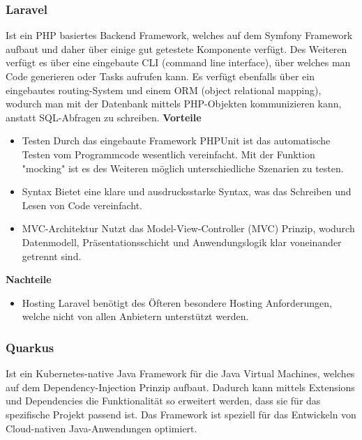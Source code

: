 \subsubsection{Laravel}
Ist ein PHP basiertes Backend Framework, welches auf dem Symfony Framework aufbaut und daher über einige gut getestete Komponente verfügt. Des Weiteren verfügt es über eine eingebaute CLI (command line interface), über welches man Code generieren oder Tasks aufrufen kann. Es verfügt ebenfalls über ein eingebautes routing-System und einem ORM (object relational mapping), wodurch man mit der Datenbank mittels PHP-Objekten kommunizieren kann, anstatt SQL-Abfragen zu schreiben.
\newline
\textbf{Vorteile}
\begin{itemize}
    \item Testen
        \newline
        Durch das eingebaute Framework PHPUnit ist das automatische Testen vom Programmcode wesentlich vereinfacht. Mit der Funktion "mocking" ist es des Weiteren möglich unterschiedliche Szenarien zu testen.
    \item Syntax
        \newline
        Bietet eine klare und ausdrucksstarke Syntax, was das Schreiben und Lesen von Code vereinfacht.
    \item MVC-Architektur
        \newline
        Nutzt das Model-View-Controller (MVC) Prinzip, wodurch Datenmodell, Präsentationsschicht und Anwendungslogik klar voneinander getrennt sind.
\end{itemize}

\textbf{Nachteile}
\begin{itemize}
    \item Hosting
        \newline
        Laravel benötigt des Öfteren besondere Hosting Anforderungen, welche nicht von allen Anbietern unterstützt werden.
\end{itemize}
\cite{backend_laravel}

\subsubsection{Quarkus}
Ist ein Kubernetes-native Java Framework für die Java Virtual Machines, welches auf dem Dependency-Injection Prinzip aufbaut. Dadurch kann mittels Extensions und Dependencies die Funktionalität so erweitert werden, dass sie für das spezifische Projekt passend ist. Das Framework ist speziell für das Entwickeln von Cloud-nativen Java-Anwendungen optimiert. 

